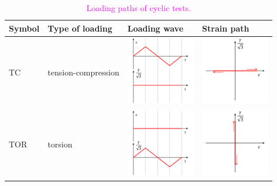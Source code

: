 \documentclass[preprint,5p,twocolumn,10pt,sort&compress]{elsarticle}
\newcommand{\jingyu}[1]{\textcolor{magenta}{#1}}
\begin{document}
\begin{table}[!ht]
  \centering
  \caption{\jingyu{Loading paths of cyclic tests.}}
    \begin{tabular}{p{2.0cm}p{4.0cm}p{4cm}p{4cm}}
    \toprule
    Symbol & Type of loading & Loading wave & Strain path  \\
    \midrule
    TC     & tension-compression  & \begin{minipage}{0.1\textwidth}\includegraphics[width=3cm]{load_path_1_time.pdf}\end{minipage}  & \begin{minipage}{0.1\textwidth}\includegraphics[width=3cm]{load_path_1.pdf}\end{minipage} \\
	\midrule
    TOR    & torsion  & \begin{minipage}{0.1\textwidth}\includegraphics[width=3cm]{load_path_2_time.pdf}\end{minipage}  & \begin{minipage}{0.1\textwidth}\includegraphics[width=3cm]{load_path_2.pdf}\end{minipage} \\
	\midrule

\end{tabular}
\end{table}
\end{document}

